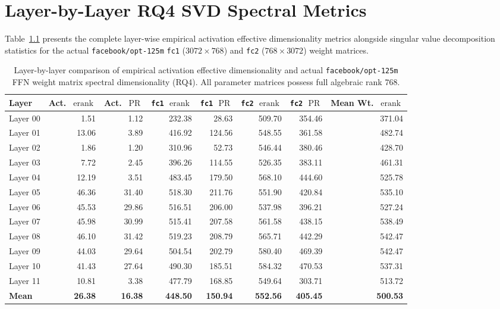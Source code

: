 \documentclass[12pt, a4paper, oneside]{report}
\theoremstyle{definition}
\newcommand{\erank}{\operatorname{erank}}
\newcommand{\PR}{\operatorname{PR}}
\begin{document}
\appendix
\chapter{Layer-by-Layer RQ4 SVD Spectral Metrics}
\label{app:rq4_details}

Table~\ref{tab:app_rq4_layer_data} presents the complete layer-wise empirical activation effective dimensionality metrics alongside singular value decomposition statistics for the actual \texttt{facebook/opt-125m} \texttt{fc1} ($3072 \times 768$) and \texttt{fc2} ($768 \times 3072$) weight matrices.

\begin{table}[htbp]
    \centering
    \caption{Layer-by-layer comparison of empirical activation effective dimensionality and actual \texttt{facebook/opt-125m} FFN weight matrix spectral dimensionality (RQ4). All parameter matrices possess full algebraic rank $768$.}
    \label{tab:app_rq4_layer_data}
    \small
    \setlength{\tabcolsep}{5pt}
    \begin{tabular}{@{}l r r r r r r r@{}}
        \toprule
        \textbf{Layer} & \textbf{Act.\ $\erank$} & \textbf{Act.\ $\PR$} & \textbf{\texttt{fc1} $\erank$} & \textbf{\texttt{fc1} $\PR$} & \textbf{\texttt{fc2} $\erank$} & \textbf{\texttt{fc2} $\PR$} & \textbf{Mean Wt.\ $\erank$} \\
        \midrule
        Layer 00 &  1.51 &  1.12 & 232.38 &  28.63 & 509.70 & 354.46 & 371.04 \\
        Layer 01 & 13.06 &  3.89 & 416.92 & 124.56 & 548.55 & 361.58 & 482.74 \\
        Layer 02 &  1.86 &  1.20 & 310.96 &  52.73 & 546.44 & 380.46 & 428.70 \\
        Layer 03 &  7.72 &  2.45 & 396.26 & 114.55 & 526.35 & 383.11 & 461.31 \\
        Layer 04 & 12.19 &  3.51 & 483.45 & 179.50 & 568.10 & 444.60 & 525.78 \\
        Layer 05 & 46.36 & 31.40 & 518.30 & 211.76 & 551.90 & 420.84 & 535.10 \\
        Layer 06 & 45.53 & 29.86 & 516.51 & 206.00 & 537.98 & 396.21 & 527.24 \\
        Layer 07 & 45.98 & 30.99 & 515.41 & 207.58 & 561.58 & 438.15 & 538.49 \\
        Layer 08 & 46.10 & 31.42 & 519.23 & 208.79 & 565.71 & 442.29 & 542.47 \\
        Layer 09 & 44.03 & 29.64 & 504.54 & 202.79 & 580.40 & 469.39 & 542.47 \\
        Layer 10 & 41.43 & 27.64 & 490.30 & 185.51 & 584.32 & 470.53 & 537.31 \\
        Layer 11 & 10.81 &  3.38 & 477.79 & 168.85 & 549.64 & 303.71 & 513.72 \\
        \midrule
        \textbf{Mean} & \textbf{26.38} & \textbf{16.38} & \textbf{448.50} & \textbf{150.94} & \textbf{552.56} & \textbf{405.45} & \textbf{500.53} \\
        \bottomrule
    \end{tabular}
\end{table}
\end{document}
